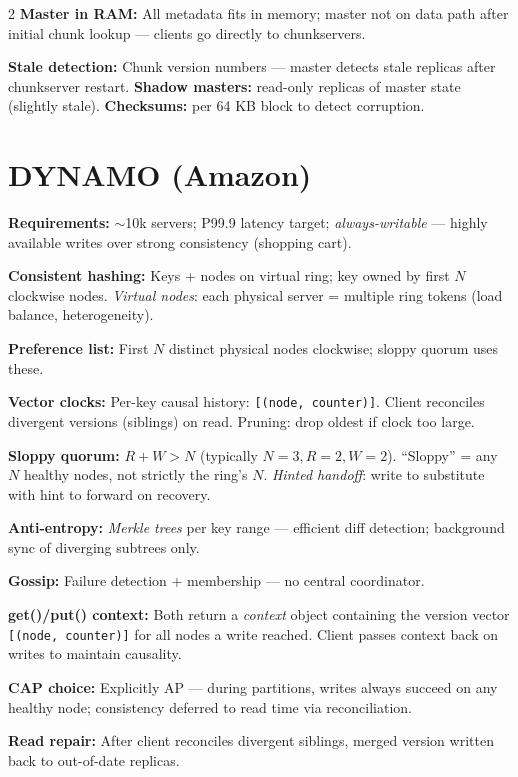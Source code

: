\documentclass[9pt]{article}
\begin{document}
\begin{multicols*}{2}
\textbf{Master in RAM:} All metadata fits in memory; master not on data path after initial chunk lookup — clients go directly to chunkservers.

\textbf{Stale detection:} Chunk version numbers — master detects stale replicas after chunkserver restart. \textbf{Shadow masters:} read-only replicas of master state (slightly stale). \textbf{Checksums:} per 64 KB block to detect corruption.

\section*{DYNAMO (Amazon)}

\textbf{Requirements:} $\sim$10k servers; P99.9 latency target; \emph{always-writable} — highly available writes over strong consistency (shopping cart).

\textbf{Consistent hashing:} Keys + nodes on virtual ring; key owned by first $N$ clockwise nodes. \emph{Virtual nodes}: each physical server = multiple ring tokens (load balance, heterogeneity).

\textbf{Preference list:} First $N$ distinct physical nodes clockwise; sloppy quorum uses these.

\textbf{Vector clocks:} Per-key causal history: \texttt{[(node, counter)]}. Client reconciles divergent versions (siblings) on read. Pruning: drop oldest if clock too large.

\textbf{Sloppy quorum:} $R + W > N$ (typically $N{=}3, R{=}2, W{=}2$). ``Sloppy'' = any $N$ healthy nodes, not strictly the ring's $N$. \emph{Hinted handoff}: write to substitute with hint to forward on recovery.

\textbf{Anti-entropy:} \emph{Merkle trees} per key range — efficient diff detection; background sync of diverging subtrees only.

\textbf{Gossip:} Failure detection + membership — no central coordinator.

\textbf{get()/put() context:} Both return a \emph{context} object containing the version vector \texttt{[(node, counter)]} for all nodes a write reached. Client passes context back on writes to maintain causality.

\textbf{CAP choice:} Explicitly AP — during partitions, writes always succeed on any healthy node; consistency deferred to read time via reconciliation.

\textbf{Read repair:} After client reconciles divergent siblings, merged version written back to out-of-date replicas.


\end{multicols*}
\end{document}
